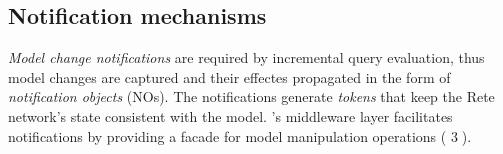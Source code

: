 


\subsection{Notification mechanisms}
\label{notifications}

\emph{Model change notifications} are required by incremental query evaluation, thus model changes are captured and their effectes propagated in the form of \emph{notification objects} (NOs). The notifications generate \emph{tokens} that keep the Rete network's state consistent with the model. \iqd{}'s middleware layer facilitates notifications by providing a facade for model manipulation operations ( \textcircled{3}).


